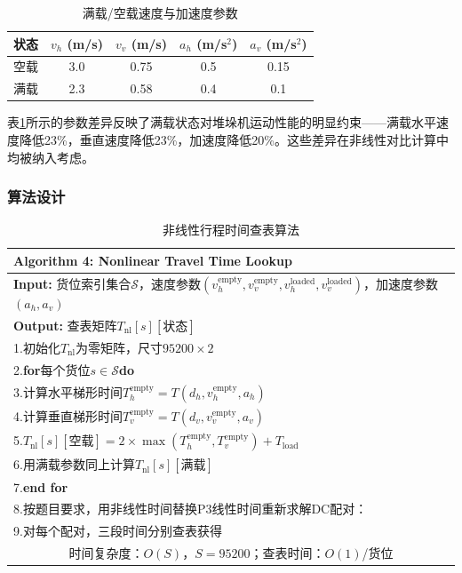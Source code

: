 \documentclass[a4paper]{cumcmthesis}
\newcommand{\headcol}{\rowcolor{tableheadcolor}}
\begin{document}
\begin{table}[htbp]
\centering\small
\caption{满载/空载速度与加速度参数}
\label{tab:speed_params}
\begin{tabular}{lcccc}
\toprule
\headcol 状态 & $v_h$ (m/s) & $v_v$ (m/s) & $a_h$ (m/s$^2$) & $a_v$ (m/s$^2$) \\
\midrule
空载 & 3.0 & 0.75 & 0.5 & 0.15 \\
满载 & 2.3 & 0.58 & 0.4 & 0.1 \\
\bottomrule
\end{tabular}
\end{table}

表\ref{tab:speed_params}所示的参数差异反映了满载状态对堆垛机运动性能的明显约束——满载水平速度降低23\%，垂直速度降低23\%，加速度降低20\%。这些差异在非线性对比计算中均被纳入考虑。

\FloatBarrier\subsubsection{算法设计}

\begin{table}[htbp]
\centering\footnotesize
\caption{非线性行程时间查表算法}
\label{tab:algo4}
\begin{tabular}{p{}}
\toprule
\headcol \textbf{Algorithm 4: Nonlinear Travel Time Lookup}\\
\midrule
\textbf{Input:} 货位索引集合$\mathcal{S}$，速度参数$(v_h^{\text{empty}},v_v^{\text{empty}},v_h^{\text{loaded}},v_v^{\text{loaded}})$，加速度参数$(a_h,a_v)$\\
\textbf{Output:} 查表矩阵$T_{\text{nl}}[s][\text{状态}]$\\
\midrule
1.\quad 初始化$T_{\text{nl}}$为零矩阵，尺寸$95200\times 2$\\
2.\quad \textbf{for}每个货位$s\in\mathcal{S}$\textbf{do}\\
3.\quad\qquad 计算水平梯形时间$T_h^{\text{empty}}=T(d_h,v_h^{\text{empty}},a_h)$\\
4.\quad\qquad 计算垂直梯形时间$T_v^{\text{empty}}=T(d_v,v_v^{\text{empty}},a_v)$\\
5.\quad\qquad $T_{\text{nl}}[s][\text{空载}]=2\times\max(T_h^{\text{empty}},T_v^{\text{empty}})+T_{\text{load}}$\\
6.\quad\qquad 用满载参数同上计算$T_{\text{nl}}[s][\text{满载}]$\\
7.\quad \textbf{end for}\\
8.\quad 按题目要求，用非线性时间替换P3线性时间重新求解DC配对：\\
9.\quad\qquad 对每个配对，三段时间分别查表获得\\
\midrule
\multicolumn{1}{c}{时间复杂度：$O(S)$，$S=95200$；查表时间：$O(1)$/货位}\\
\bottomrule
\end{tabular}
\end{table}
\end{document}
